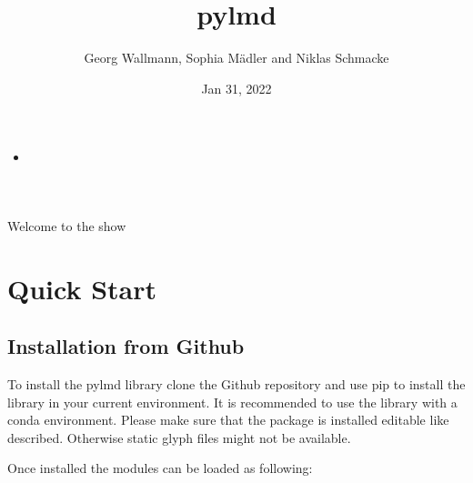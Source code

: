 \documentclass[letterpaper,10pt,english,openany,oneside]{sphinxmanual}
\title{py\sphinxhyphen{}lmd}
\date{Jan 31, 2022}
\author{Georg Wallmann, Sophia Mädler and Niklas Schmacke}
\begin{document}
\pagestyle{empty}
\sphinxmaketitle
\pagestyle{plain}
\sphinxtableofcontents
\pagestyle{normal}
\label{\detokenize{index::doc}}


\begin{sphinxShadowBox}
\begin{itemize}
\item {} 
\sphinxAtStartPar
{}\label{\detokenize{index:id1}}{\hyperref[\detokenize{index:overview}]{}}

\end{itemize}
\end{sphinxShadowBox}

\sphinxAtStartPar
Welcome to the show


\chapter{Quick Start}
\label{\detokenize{pages/quickstart:quick-start}}\label{\detokenize{pages/quickstart::doc}}

\section{Installation from Github}
\label{\detokenize{pages/quickstart:installation-from-github}}
\sphinxAtStartPar
To install the py\sphinxhyphen{}lmd library clone the Github repository and use pip to install the library in your current environment. It is recommended to use the library with a conda environment. Please make sure that the package is installed editable like described. Otherwise static glyph files might not be available.

\begin{sphinxVerbatim}[commandchars=\\\{\}]
  
   
\end{sphinxVerbatim}

\sphinxAtStartPar
Once installed the modules can be loaded as following:

\begin{sphinxVerbatim}[commandchars=\\\{\}]
    
\end{sphinxVerbatim}
\end{document}
